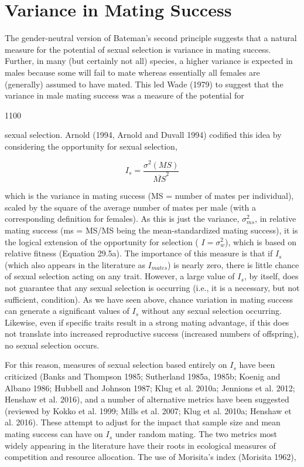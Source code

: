 \documentclass{article}
\begin{document}
\section{Variance in Mating Success}
The gender-neutral version of Bateman's second principle suggests that a natural measure for the potential of sexual selection is variance in mating success. Further, in many (but certainly not all) species, a higher variance is expected in males because some will fail to mate whereas essentially all females are (generally) assumed to have mated. This led Wade (1979) to suggest that the variance in male mating success was a measure of the potential for

1100

sexual selection. Arnold (1994, Arnold and Duvall 1994) codified this idea by considering the opportunity for sexual selection,

\begin{equation}
I_{s}=\frac{\sigma^{2}(MS)}{\overline{MS}^{2}}
\tag{29.11a}
\label{eq:29_11a}
\end{equation}

which is the variance in mating success (MS = number of mates per individual), scaled by the square of the average number of mates per male (with a corresponding definition for females). As this is just the variance,  $ \sigma_{ms}^{2} $, in relative mating success (ms = MS/MS being the mean-standardized mating success), it is the logical extension of the opportunity for selection ( $ I = \sigma_{w}^{2} $), which is based on relative fitness (Equation 29.5a). The importance of this measure is that if  $ I_{s} $ (which also appears in the literature as  $ I_{mates} $) is nearly zero, there is little chance of sexual selection acting on any trait. However, a large value of  $ I_{s} $, by itself, does not guarantee that any sexual selection is occurring (i.e., it is a necessary, but not sufficient, condition). As we have seen above, chance variation in mating success can generate a significant values of  $ I_{s} $ without any sexual selection occurring. Likewise, even if specific traits result in a strong mating advantage, if this does not translate into increased reproductive success (increased numbers of offspring), no sexual selection occurs.

For this reason, measures of sexual selection based entirely on  $ I_{s} $ have been criticized (Banks and Thompson 1985; Sutherland 1985a, 1985b; Koenig and Albano 1986; Hubbell and Johnson 1987; Klug et al. 2010a; Jennions et al. 2012; Henshaw et al. 2016), and a number of alternative metrics have been suggested (reviewed by Kokko et al. 1999; Mills et al. 2007; Klug et al. 2010a; Henshaw et al. 2016). These attempt to adjust for the impact that sample size and mean mating success can have on  $ I_{s} $ under random mating. The two metrics most widely appearing in the literature have their roots in ecological measures of competition and resource allocation. The use of Morisita's index (Morisita 1962),
\end{document}
